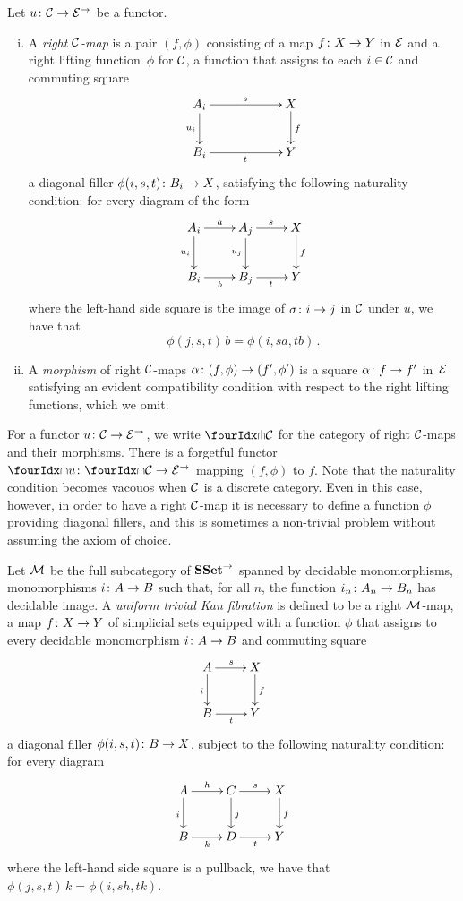 \documentclass[reqno,10pt,a4paper,oneside]{amsart}
\begin{document}
 \begin{definition} Let $u \co \cal{C} \to \catE^\to$ be a functor. 
 \begin{enumerate}[(i)] 
 \item  A \emph{right $\cal{C}$-map}
 is a pair $(f, \phi)$ consisting of a map $f \co X \to Y$ in $\cal{E}$ and a right lifting function~$\phi$ for $\cal{C}$, \ie 
 a function that assigns to each $i \in \cal{C}$ and commuting square
\[
\xymatrix@C=2cm{
A_i \ar[r]^{s}   \ar[d]_{u_i} & X \ar[d]^f \\
B_i \ar[r]_{t} & Y}
\]
a diagonal filler $\phi(i,s, t) \co B_i \to X$, satisfying the following naturality 
condition: for every diagram of the form
\[
\xymatrix{
A_i \ar[r]^a \ar[d]_{u_i} & A_j \ar[r]^{s}  \ar[d]_{u_j} & X \ar[d]^f   \\
B_i \ar[r]_{b}  & B_j  \ar[r]_{t}  & Y }
\]
where the left-hand side square is the image of $\sigma \co i \to j$ in $\cal{C}$ under $u$, 
we have that 
\[
\phi(j, s, t) \, b = \phi(i, s  a, t  b) \, .
\]
\item A \emph{morphism} of right $\cal{C}$-maps $\alpha \co (f, \phi) \to (f', \phi')$ is a 
square $\alpha \co f \to f'$ in~$\catE$ satisfying an evident compatibility condition 
with respect to the right lifting functions, which we omit. 
\end{enumerate}
\end{definition}

For a functor $u \co \cal{C} \to \catE^\to$, we write $\liftr{\cal{C}}$ for the category  of 
right $\cal{C}$-maps and their morphisms. There is a forgetful functor~$\liftr{u} \co \liftr{\cal{C}} \to \catE^\to$
mapping $(f, \phi)$ to $f$. Note that the naturality condition becomes vacouos when $\cal{C}$ is a discrete category. Even in this case, however, in order to have a right $\cal{C}$-map it is necessary to define a function $\phi$ providing 
diagonal fillers, and this is sometimes a non-trivial problem without assuming the axiom of choice. 

\begin{example}  \label{exa-triv-kan-fib}
Let $\cal{M}$ be the full subcategory of $\SSet^\to$ spanned by decidable mo\-no\-mor\-phisms, \ie
mo\-no\-mor\-phisms $i \co A \to B$ such that, for all $n$, the function $i_n \co A_n \to B_n$ has decidable
image. A \emph{uniform trivial Kan fibration} is defined to be a right $\cal{M}$-map, \ie 
a map $f \co X \to Y$ of simplicial sets equipped with a function $\phi$
that assigns to every decidable monomorphism $i \co A \to B$ and commuting square 
 \[
 \xymatrix{
 A \ar[r]^s \ar[d]_i & X \ar[d]^f \\
 B \ar[r]_t & Y}
 \]
a diagonal filler $\phi(i, s, t) \co B \to X$, subject to the following naturality condition: for every 
diagram 
\[
\xymatrix{
A \ar[r]^{h} \ar[d]_{i} & C \ar[d]^{j}  \ar[r]^s & X \ar[d]^f \\
B \ar[r]_{k} & D \ar[r]_t & Y }
\]
where the left-hand side square is a pullback, we have that $\phi(j, s, t) \, k = \phi(i, s  h, t  k)$.
\end{example}
\end{document}
